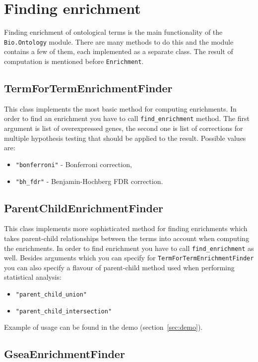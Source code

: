 \documentclass{report}
\begin{document}
\section{Finding enrichment}
Finding enrichment of ontological terms is the main
functionality of the \verb|Bio.Ontology|
module. There are many methods to do this and the module contains a
few of them, each implemented as a separate class. The result of
computation is mentioned before \verb|Enrichment|.

\subsection{TermForTermEnrichmentFinder}
This class implements the most basic method for computing
enrichments.
In order to find an enrichment you have to call \verb|find_enrichment| method.
The first argument is list of overexpressed genes, the second one is list of
corrections for multiple hypothesis testing that should be applied to the
result. Possible values are:
\begin{itemize}
\item \verb|"bonferroni"| - Bonferroni correction,
\item \verb|"bh_fdr"| - Benjamin-Hochberg FDR correction.
\end{itemize}

\subsection{ParentChildEnrichmentFinder}
This class implements more sophisticated method for finding
enrichments which takes parent-child relationships between
the terms into account when computing the enrichments.
In order to find enrichment you have to call \verb|find_enrichment| as
well. 
Besides arguments which you can specify for
\verb|TermForTermEnrichmentFinder| you can also specify a flavour of
parent-child method used when performing statistical analysis:
\begin{itemize}
\item \verb|"parent_child_union"|
\item \verb|"parent_child_intersection"|
\end{itemize}

Example of usage can be found in the demo (section~\ref{sec:demo}).
\subsection{GseaEnrichmentFinder}
\end{document}
